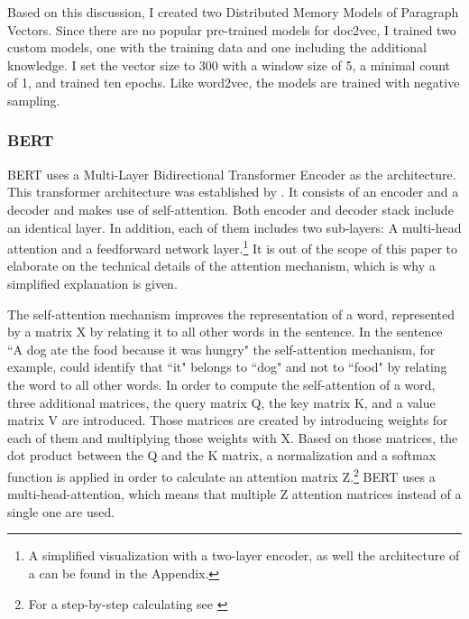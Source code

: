 \documentclass[12pt, a4paper, titlepage]{article}
\begin{document}
Based on this discussion, I created two Distributed Memory Models of Paragraph Vectors. Since there are no popular pre-trained models for doc2vec, I trained two custom models, one with the training data and one including the additional knowledge. I set the vector size to 300 with a window size of 5, a minimal count of 1, and trained ten epochs. Like word2vec, the models are trained with negative sampling. 

\subsubsection*{BERT}
\ac{BERT} uses a Multi-Layer Bidirectional Transformer Encoder as the architecture. This transformer architecture was established by \citet{vaswani2017}. It consists of an encoder and a decoder and makes use of self-attention. Both encoder and decoder stack include an identical layer. In addition, each of them includes two sub-layers: A multi-head attention and a feedforward network layer.\footnote{A simplified visualization with a two-layer encoder, as well the architecture of a can be found in the Appendix.} It is out of the scope of this paper to elaborate on the technical details of the attention mechanism, which is why a simplified explanation is given. 

The self-attention mechanism improves the representation of a word, represented by a matrix X by relating it to all other words in the sentence. In the sentence ``A dog ate the food because it was hungry" \citep[10]{ravichandiran2021} the self-attention mechanism, for example, could identify that ``it" belongs to ``dog" and not to ``food" by relating the word to all other words. In order to compute the self-attention of a word, three additional matrices, the query matrix Q, the key matrix K, and a value matrix V are introduced. Those matrices are created by introducing weights for each of them and multiplying those weights with X. Based on those matrices, the dot product between the Q and the K matrix, a normalization and a softmax function is applied in order to calculate an attention matrix Z.\footnote{For a step-by-step calculating see \citep{ravichandiran2021}} \ac{BERT} uses a multi-head-attention, which means that multiple Z attention matrices instead of a single one are used.
\end{document}
